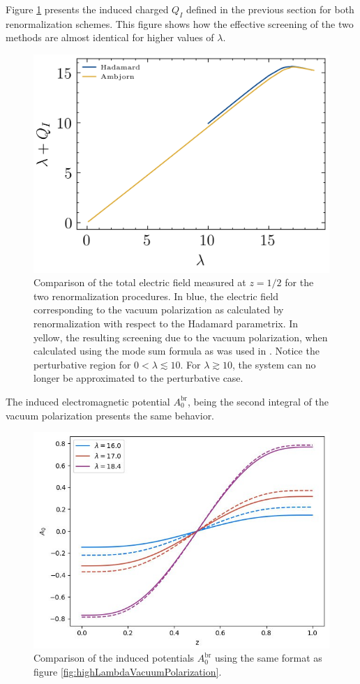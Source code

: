 Figure \ref{fig:different-lambda-rho} presents the induced charged $Q_I$ defined in the previous section for both renormalization schemes. This figure shows how the effective screening of the two methods are almost identical for higher values of $\lambda$.
\begin{figure}
    \centering
    \includegraphics[width=0.5\linewidth]{figures/dirichlet/electricFieldInducedComparison.png}
    \caption{Comparison of the total electric field measured at $z=1/2$ for the two renormalization procedures. In blue, the electric field corresponding to the vacuum polarization as calculated by renormalization with respect to the Hadamard parametrix. In yellow, the resulting screening due to the vacuum polarization, when calculated using the mode sum formula as was used in \cite{Ambj1983}. Notice the perturbative region for $0 <\lambda \lesssim10$. For $\lambda \gtrsim 10$, the system can no longer be approximated to the perturbative case. } 
    \label{fig:different-lambda-rho}
\end{figure}

The induced electromagnetic potential $A_0^\text{br}$, being the second integral of the vacuum polarization presents the same behavior. 
\begin{figure}
    \centering
    \includegraphics[width=0.5\linewidth]{figures/dirichlet/highLambdaValuesA0Induced.jpg}
    \caption{Comparison of the induced potentials $A_0^\text{br}$ using the same format as figure \ref{fig:highLambdaVacuumPolarization}.}
    \label{fig:enter-label}
\end{figure}

